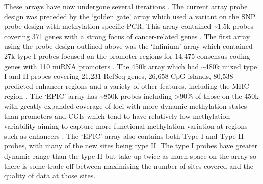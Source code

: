 \documentclass[
]{book}
\begin{document}
These arrays have now undergone several iterations \citep[\citet{Bibikova2011},\citet{Moran2015}]{Bibikova2009}. The current array probe design was preceded by the `golden gate' array which used a variant on the SNP probe design with methylation-specific PCR, This array contained \textasciitilde1.5k probes covering 371 genes with a strong focus of cancer-related genes \citep{Bibikova2006}. The first array using the probe design outlined above was the `Infinium' array which contained 27k type I probes focused on the promoter regions for 14,475 consensus coding genes with 110 miRNA promoters \citep{Bibikova2009}. The 450k array which had \textasciitilde480k mixed type I and II probes covering 21,231 RefSeq genes, 26,658 CpG islands, 80,538 predicted enhancer regions and a variety of other features, including the MHC region \citep{Bibikova2011}. The `EPIC' array has \textasciitilde850k probes including \textgreater90\% of those on the 450k with greatly expanded coverage of loci with more dynamic methylation states than promoters and CGIs which tend to have relatively low methylation variability aiming to capture more functional methylation variation at regions such as enhancers \citep[\citet{Ziller2013}]{Moran2015}. The `EPIC' array also contains both Type I and Type II probes, with many of the new sites being type II. The type I probes have greater dynamic range than the type II but take up twice as much space on the array so there is some trade-off between maximising the number of sites covered and the quality of data at those sites.
\end{document}
